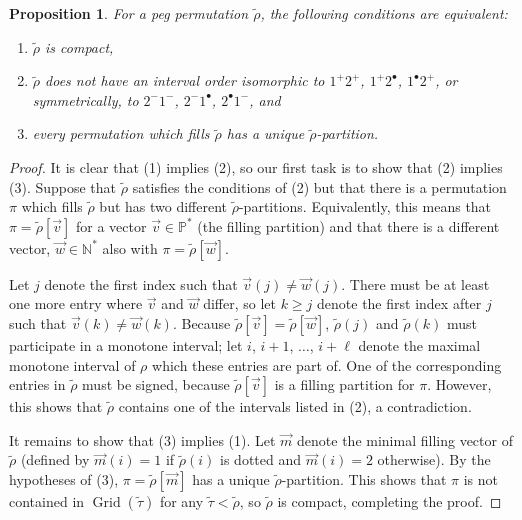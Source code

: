 \documentclass[10pt]{article}
\theoremstyle{plain}
\newtheorem{proposition}[theorem]{Proposition}
\theoremstyle{definition}
\newcommand{\Grid}{\operatorname{Grid}}
\newcommand{\p}[1]{#1^+}
\newcommand{\m}[1]{#1^-}
\renewcommand{\d}[1]{#1^{\bullet}}
\begin{document}
\begin{proposition}
\label{prop-tfae-compact-filling}
For a peg permutation $\tilde{\rho}$, the following conditions are equivalent:
\begin{enumerate}
\item[(1)] $\tilde{\rho}$ is compact,
\item[(2)] $\tilde{\rho}$ does not have an interval order isomorphic to  
$\p{1}\p{2}$, $\p{1}\d{2}$, $\d{1}\p{2}$, or symmetrically, to $\m{2}\m{1}$, 
$\m{2}\d{1}$, $\d{2}\m{1}$, and
\item[(3)] every permutation which fills $\tilde{\rho}$ has a unique 
$\tilde{\rho}$-partition.
\end{enumerate}
\end{proposition}
\begin{proof}
It is clear that (1) implies (2), so our first task is to show that (2) implies (3). Suppose that $\tilde{\rho}$ satisfies the conditions of (2) but that there is a permutation $\pi$ which fills $\tilde{\rho}$ but has two different $\tilde{\rho}$-partitions. Equivalently, this means that $\pi=\tilde{\rho}[\vec{v}]$ for a vector $\vec{v}\in\mathbb{P}^\ast$ (the filling partition) and that there is a different vector, $\vec{w}\in\mathbb{N}^\ast$ also with $\pi=\tilde{\rho}[\vec{w}]$.

Let $j$ denote the first index such that $\vec{v}(j)\neq\vec{w}(j)$. There must be at least one more entry where $\vec{v}$ and $\vec{w}$ differ, so let $k\ge j$ denote the first index after $j$ such that $\vec{v}(k)\neq\vec{w}(k)$. Because $\tilde{\rho}[\vec{v}]=\tilde{\rho}[\vec{w}]$, $\tilde{\rho}(j)$ and $\tilde{\rho}(k)$ must participate in a monotone interval; let $i$, $i+1$, $\dots$, $i+\ell$ denote the maximal monotone interval of $\rho$ which these entries are part of. One of the corresponding entries in $\tilde{\rho}$ must be signed, because $\tilde{\rho}[\vec{v}]$ is a filling partition for $\pi$. However, this shows that $\tilde{\rho}$ contains one of the intervals listed in (2), a contradiction.

It remains to show that (3) implies (1). Let $\vec{m}$ denote the minimal filling vector of $\tilde{\rho}$ (defined by $\vec{m}(i)=1$ if $\tilde{\rho}(i)$ is dotted and $\vec{m}(i)=2$ otherwise). By the hypotheses of (3), $\pi=\tilde{\rho}[\vec{m}]$ has a unique $\tilde{\rho}$-partition. This shows that $\pi$ is not contained in $\Grid(\tilde{\tau})$ for any $\tilde{\tau}<\tilde{\rho}$, so $\tilde{\rho}$ is compact, completing the proof.
\end{proof}
\end{document}

